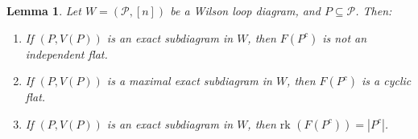 \documentclass[11pt]{article}
\newcommand{\rk}{\textrm{rk }}
\newcommand{\cP}{\mathcal{P}}
\newtheorem{lem}[thm]{Lemma}
\theoremstyle{remark}
\theoremstyle{definition}
\begin{document}
\begin{lem} \label{maxexactcomplementrank}
Let $W = (\cP, [n])$ be a Wilson loop diagram, and $P \subseteq \cP$. Then: \begin{enumerate}
\item If $(P,V(P))$ is an exact subdiagram in $W$, then $F(P^c)$ is not an independent flat.
\item If $(P,V(P))$ is a maximal exact subdiagram in $W$, then $F(P^c)$ is a cyclic flat.                                                                                                                                                                                                                                                                                                                                                                                                                                                                                                                                                                                                                                                                                                                                                                                                                                                                                                                                                                          \item If $(P,V(P))$ is an exact subdiagram in $W$, then $\rk(F(P^c)) = |P^c|$.
\end{enumerate}
\end{lem}
\end{document}
